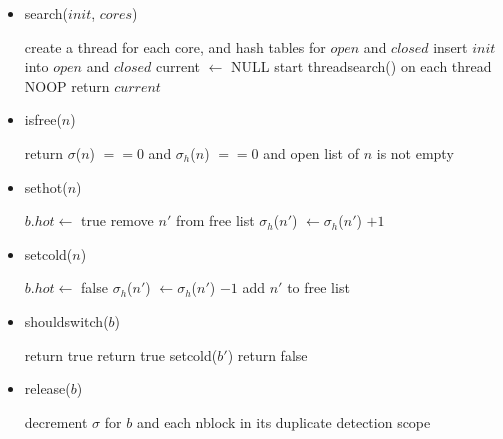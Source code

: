 \documentclass{article}
\begin{document}
\begin{itemize}
  \item search($init$, $cores$)
  \begin{algorithmic}[1]
  \STATE create a thread for each core, and hash tables for $open$ and $closed$
  \STATE insert $init$ into $open$ and $closed$
  \STATE current $\leftarrow$ NULL
  \STATE start threadsearch() on each thread
    \STATE NOOP
  \ENDWHILE
  \STATE return $current$
  \end{algorithmic}
  
  \item isfree($n$)
  \begin{algorithmic}[1]
  \STATE return $\sigma$($n$) $== 0$ and $\sigma_h$($n$) $== 0$ and open list of $n$ is not empty
  \end{algorithmic}
  
  \item sethot($n$)
  \begin{algorithmic}[1]
    \STATE $b.hot \leftarrow$ true
        \STATE remove $n'$ from free list
      \ENDIF
      \STATE $\sigma_h$($n'$) $\leftarrow \sigma_h$($n'$) $+ 1$
    \ENDFOR
  \ENDIF
  \end{algorithmic}
  
  \item setcold($n$)
  \begin{algorithmic}[1]
  \STATE $b.hot \leftarrow$ false
    \STATE $\sigma_h$($n'$) $\leftarrow \sigma_h$($n'$) $- 1$
      \STATE add $n'$ to free list
    \ENDIF
  \ENDFOR
  \end{algorithmic}

  \item shouldswitch($b$)
  \begin{algorithmic}[1]
  \STATE {}
    \STATE return true
    \STATE return true
  \ELSE
        \STATE setcold($b'$)
      \ENDIF
    \ENDFOR
    \STATE return false
  \ENDIF
  \end{algorithmic}

  \item release($b$)
  \begin{algorithmic}[1]
  \STATE decrement $\sigma$ for $b$ and each nblock in its duplicate detection scope
  \end{algorithmic}


\end{itemize}
\end{document}
